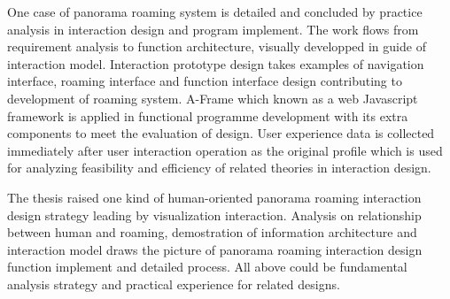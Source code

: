 \begin{enabstract}
\begin{spacing}{1.0}
One case of panorama roaming system is detailed and concluded by practice analysis in interaction design and program implement. The work flows from requirement analysis to function architecture, visually developped in guide of interaction model. Interaction prototype design takes examples of navigation interface, roaming interface and function interface design contributing to development of roaming system. A-Frame which known as a web Javascript framework is applied in functional programme development with its extra components to meet the evaluation of design. User experience data is collected immediately after user interaction operation as the original profile which is used for analyzing feasibility and efficiency of related theories in interaction design.


The thesis raised one kind of human-oriented panorama roaming interaction design strategy leading by visualization interaction. Analysis on relationship between human and roaming, demostration of information architecture and interaction model draws the picture of panorama roaming interaction design function implement and detailed process. All above could be fundamental analysis strategy and practical experience for related designs.

\end{spacing}
\end{enabstract}
